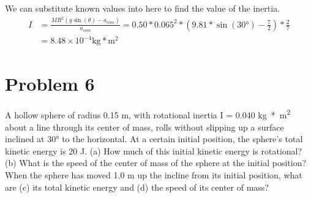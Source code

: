 \documentclass[12pt]{article}
\begin{document}
We can substitute known values into here to find the value of the inertia.
\begin{align}
    I   &=  \frac{MR^2(g\sin(\theta) - a_{com})}{a_{com}}
        =   0.50*0.065^2*(9.81*\sin(30\unit{\degree}) - \frac{7}{2})*\frac{2}{7}\\
        &=  \boxed{8.48 \times 10^{-4}\unit{\kilo\gram*\meter^2}}
\end{align}






\pagebreak
\section{Problem 6}
A hollow sphere of radius 0.15 m, with rotational inertia I = 0.040 \unit{\kilo\gram*\meter^2} about a line through its center of mass, rolls without slipping up a surface inclined at 30\unit{\degree} to the horizontal. At a certain initial position, the sphere's total kinetic energy is 20 J. (a) How much of this initial kinetic energy is rotational? (b) What is the speed of the center of mass of the sphere at the initial position? When the sphere has moved 1.0 m up the incline from its initial position, what are (c) its total kinetic energy and (d) the speed of its center of mass?
\end{document}
